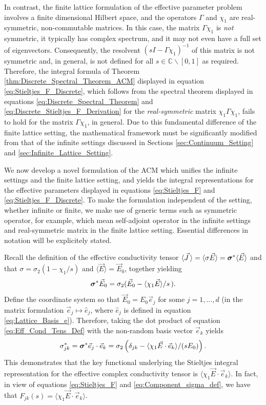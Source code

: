 \documentclass{cmslatex}
\newcommand\bsig{\mbox{\boldmath${\sigma}$}}
\begin{document}
In contrast, the finite lattice formulation of the effective parameter
problem involves a finite dimensional Hilbert space, and the operators
$\Gamma$ and $\chi_1$ are real-symmetric, non-commutable matrices. In this
case, the matrix $\Gamma\chi_1$ is \emph{not} symmetric, it typically has
complex spectrum, and it may not even have a full set of
eigenvectors. Consequently, the resolvent $(sI-\Gamma\chi_1)^{-1}$ of this
matrix is not symmetric and, in general, is 
not defined for all $s\in\mathbb{C}\backslash[0,1]$ as required. Therefore, the
integral formula of Theorem \ref{thm:Discrete_Spectral_Theorem_ACM}
displayed in equation \eqref{eq:Stieltjes_F_Discrete}, which follows
from the spectral theorem displayed in equations
\eqref{eq:Discrete_Spectral_Theorem} and 
\eqref{eq:Discrete_Stieltjes_F_Derivation} for the
\emph{real-symmetric} matrix $\chi_1\Gamma\chi_1$, fails to hold for the matrix
$\Gamma\chi_1$, in general. Due to this fundamental difference of the finite
lattice setting, the mathematical framework must be significantly
modified from that of the infinite settings discussed in Sections
\ref{sec:Continuum_Setting} and \ref{sec:Infinite_Lattice_Setting}.



We now develop a novel formulation of the ACM which unifies the
infinite settings and the finite lattice setting, and yields the
integral representations for the effective parameters displayed in
equations \eqref{eq:Stieltjes_F} and
\eqref{eq:Stieltjes_F_Discrete}. To make the formulation independent
of the setting, whether infinite or finite, we make use of generic
terms such as symmetric operator, for example, which mean self-adjoint
operator in the infinite settings and real-symmetric matrix in the
finite lattice setting. Essential differences in notation will be
explicitely stated. 



Recall the definition of the effective conductivity tensor
$\langle\vec{J}\,\rangle=\langle\sigma\vec{E}\rangle=\bsig^*\langle\vec{E}\rangle$ and that $\sigma=\sigma_2(1-\chi_1/s)$ and
$\langle\vec{E}\rangle=\vec{E}_0$, together yielding  
% 
\begin{align}\label{eq:Eff_Cond_Tens_Def}
  \bsig^*\vec{E}_0=\sigma_2(\vec{E}_0 -\langle\chi_1\vec{E}\rangle/s\,).
\end{align}
%
Define the coordinate system so that $\vec{E}_0=E_0\vec{e}_j$ for
some $j=1,\ldots,d$ (in the matrix formulation
$\vec{e}_j\mapsto\hat{e}_j$, where $\hat{e}_j$ is defined in equation
\eqref{eq:Lattice_Basis_e}). Therefore, taking the dot product of
equation  \eqref{eq:Eff_Cond_Tens_Def} with the non-random basis vector
$\vec{e}_k$ yields 
%
\begin{align}\label{eq:Component_sigma_def}
  \sigma^*_{jk}=\bsig^*\vec{e}_j\cdot\vec{e}_k=\sigma_2\left(\delta_{jk}-\langle\chi_1\vec{E}\cdot\vec{e}_k\rangle/(sE_0)\right). 
\end{align}
%
This demonstrates that the key functional underlying the Stieltjes
integral representation for the effective complex conductivity tensor
is $\langle\chi_1\vec{E}\cdot\vec{e}_k\rangle$. In fact, in view of equations
\eqref{eq:Stieltjes_F} and \eqref{eq:Component_sigma_def}, we have
that $F_{jk}(s)=\langle\chi_1\vec{E}\cdot\vec{e}_k\rangle$. 
\end{document}
